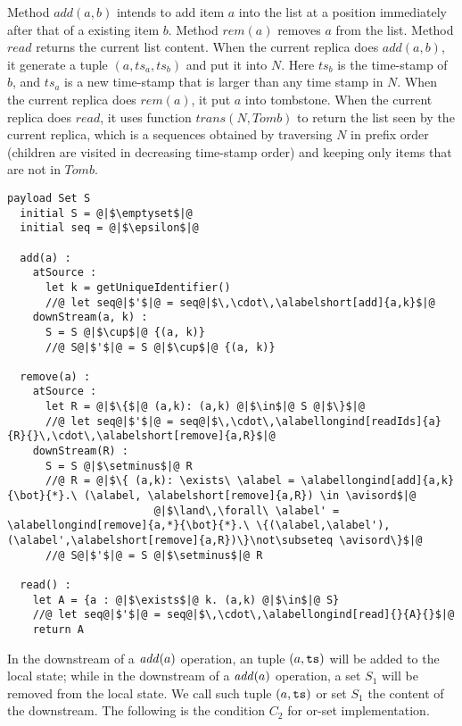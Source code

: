 Method $\mathit{add}(a,b)$ intends to add item $a$ into the list at a position immediately after that of a existing item $b$. Method $\mathit{rem}(a)$ removes $a$ from the list. Method $\mathit{read}$ returns the current list content. When the current replica does $\mathit{add}(a,b)$, it generate a tuple $(a,ts_a,ts_b)$ and put it into $N$. Here $ts_b$ is the time-stamp of $b$, and $ts_a$ is a new time-stamp that is larger than any time stamp in $N$. When the current replica does $\mathit{rem}(a)$, it put $a$ into tombstone. When the current replica does $\mathit{read}$, it uses function $\mathit{trans}(N,\mathit{Tomb})$ to return the list seen by the current replica, which is a sequences obtained by traversing $N$ in prefix order (children are visited in decreasing time-stamp order) and keeping only items that are not in $\mathit{Tomb}$.


\begin{minipage}[t]{1.0\linewidth}
\begin{lstlisting}[frame=top,caption={Pseudo-code of the or-set CRDT},
captionpos=b,label={lst:or-set}]
  payload Set S
  initial S = @|$\emptyset$|@
  initial seq = @|$\epsilon$|@

  add(a) :
    atSource :
      let k = getUniqueIdentifier()
      //@ let seq@|$'$|@ = seq@|$\,\cdot\,\alabelshort[add]{a,k}$|@
    downStream(a, k) :
      S = S @|$\cup$|@ {(a, k)}
      //@ S@|$'$|@ = S @|$\cup$|@ {(a, k)}

  remove(a) :
    atSource :
      let R = @|$\{$|@ (a,k): (a,k) @|$\in$|@ S @|$\}$|@
      //@ let seq@|$'$|@ = seq@|$\,\cdot\,\alabellongind[readIds]{a}{R}{}\,\cdot\,\alabelshort[remove]{a,R}$|@
    downStream(R) :
      S = S @|$\setminus$|@ R
      //@ R = @|$\{ (a,k): \exists\ \alabel = \alabellongind[add]{a,k}{\bot}{*}.\ (\alabel, \alabelshort[remove]{a,R}) \in \avisord$|@
                       @|$\land\,\forall\ \alabel' = \alabellongind[remove]{a,*}{\bot}{*}.\ \{(\alabel,\alabel'),(\alabel',\alabelshort[remove]{a,R})\}\not\subseteq \avisord\}$|@
      //@ S@|$'$|@ = S @|$\setminus$|@ R

  read() :
    let A = {a : @|$\exists$|@ k. (a,k) @|$\in$|@ S}
    //@ let seq@|$'$|@ = seq@|$\,\cdot\,\alabellongind[read]{}{A}{}$|@
    return A
\end{lstlisting}
\end{minipage}

In the downstream of a $\alabellongNoret[\mathit{add}]{\argv}$
operation, an tuple $(\argv,\ats)$ will be added to the local state;
while in the downstream of a $\alabellongNoret[\mathit{add}]{\argv}$
operation, a set $S_1$ will be removed from the local state. We call
such tuple $(\argv,\ats)$ or set $S_1$ the content of the downstream.
The following is the condition $C_2$ for or-set implementation.

